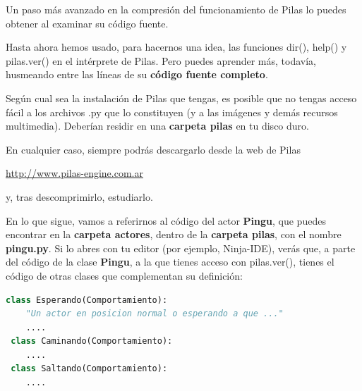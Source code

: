 \documentclass{article}
\begin{document}
\begin{tcolorbox}[skin=widget,
boxrule=1mm,
coltitle=black,
colframe=blue!45!white,
colback=white,
width=(.9\linewidth),before=\hfill,after=\hfill,
adjusted title={Más Código Fuente de Pilas}]

Un paso más avanzado en la compresión del funcionamiento de Pilas lo puedes obtener al examinar su código fuente.\par
Hasta ahora hemos usado, para hacernos una idea, las funciones dir(), help() y pilas.ver() en el intérprete de Pilas. Pero puedes aprender más, todavía, husmeando entre las líneas de su \textbf{código fuente completo}.\par
Según cual sea la instalación de Pilas que tengas, es posible que no tengas acceso fácil a los archivos .py que lo constituyen (y a las imágenes y demás recursos multimedia). Deberían residir en una \textbf{carpeta pilas} en tu disco duro.\par
En cualquier caso, siempre podrás descargarlo desde la web de Pilas\par

\vspace{\baselineskip}
\begin{center}
\href{http://www.pilas-engine.com.ar}{http://www.pilas-engine.com.ar}
\end{center}
\vspace{\baselineskip}

y, tras descomprimirlo, estudiarlo.\par

En lo que sigue, vamos a referirnos al código del actor \textbf{Pingu}, que puedes encontrar en la \textbf{carpeta actores}, dentro de la \textbf{carpeta pilas}, con el nombre \textbf{pingu.py}. Si lo abres con tu editor (por ejemplo, Ninja-IDE), verás que, a parte del código de la clase \textbf{Pingu}, a la que tienes acceso con pilas.ver(), tienes el código de otras clases que complementan su definición:\par
  
\begin{lstlisting}[language=Python]
class Esperando(Comportamiento):
    "Un actor en posicion normal o esperando a que ..."
    ....
 class Caminando(Comportamiento):
    ....
 class Saltando(Comportamiento):
    ....
\end{lstlisting}

\end{tcolorbox}
\vspace{\baselineskip}
\end{document}
